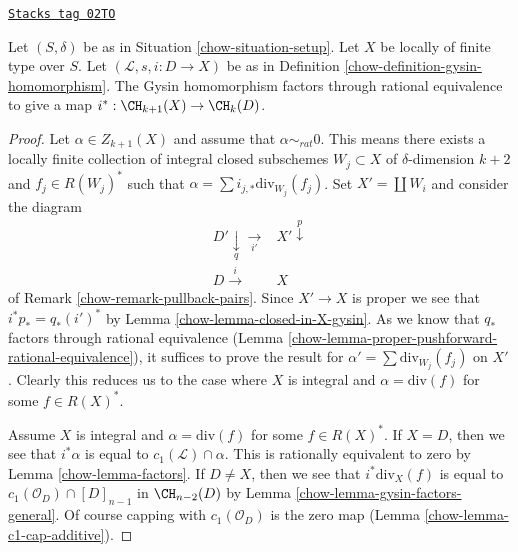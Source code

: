 \begin{lemma}
\label{chow-lemma-gysin-factors}
\href{https://stacks.math.columbia.edu/tag/02TO}{\texttt{Stacks tag 02TO}}

Let $(S, \delta)$ be as in Situation \ref{chow-situation-setup}.
Let $X$ be locally of finite type over $S$.
Let $(\mathcal{L}, s, i : D \to X)$ be as in
Definition \ref{chow-definition-gysin-homomorphism}.
The Gysin homomorphism factors through rational equivalence to
give a map $i^* : \CH_{k + 1}(X) \to \CH_k(D)$.
\end{lemma}

\begin{proof}

Let $\alpha \in Z_{k + 1}(X)$ and assume that $\alpha \sim_{rat} 0$.
This means there exists a locally finite collection of integral
closed subschemes $W_j \subset X$ of $\delta$-dimension $k + 2$
and $f_j \in R(W_j)^*$ such that
$\alpha = \sum i_{j, *}\text{div}_{W_j}(f_j)$.
Set $X' = \coprod W_i$ and consider the diagram
$$
\begin{array}{cc}D' \underset{q}{\downarrow}\underset{i'}{\longrightarrow} & X' \overset{p}{\downarrow} \\ D \overset{i}{\longrightarrow} & X\end{array}
$$
of Remark \ref{chow-remark-pullback-pairs}. Since $X' \to X$ is proper
we see that $i^*p_* = q_*(i')^*$ by Lemma \ref{chow-lemma-closed-in-X-gysin}.
As we know that $q_*$ factors through rational equivalence
(Lemma \ref{chow-lemma-proper-pushforward-rational-equivalence}), it suffices
to prove the result for $\alpha' = \sum \text{div}_{W_j}(f_j)$
on $X'$. Clearly this reduces us to the case where $X$ is integral
and $\alpha = \text{div}(f)$ for some $f \in R(X)^*$.

\medskip\noindent
Assume $X$ is integral and $\alpha = \text{div}(f)$ for some $f \in R(X)^*$.
If $X = D$, then we see that $i^*\alpha$ is equal
to $c_1(\mathcal{L}) \cap \alpha$.
This is rationally equivalent to zero by Lemma \ref{chow-lemma-factors}.
If $D \not = X$, then we see that $i^*\text{div}_X(f)$ is equal to
$c_1(\mathcal{O}_D) \cap [D]_{n - 1}$ in $\CH_{n - 2}(D)$ by
Lemma \ref{chow-lemma-gysin-factors-general}. Of course
capping with $c_1(\mathcal{O}_D)$ is the zero map
(Lemma \ref{chow-lemma-c1-cap-additive}).
\end{proof}

